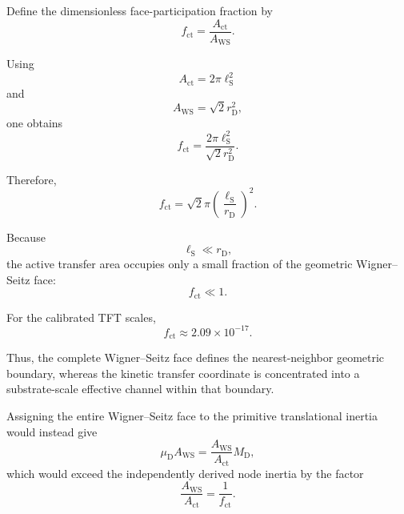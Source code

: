 Define the dimensionless face-participation fraction by
\begin{equation}
    f_{\mathrm{ct}} = \frac{A_{\mathrm{ct}}}{A_{\mathrm{WS}}}.
\end{equation}

Using
\begin{equation}
    A_{\mathrm{ct}} = 2\pi\ell_{\mathrm{S}}^2
\end{equation}
and
\begin{equation}
    A_{\mathrm{WS}} = \sqrt{2}r_{\mathrm{D}}^2,
\end{equation}
one obtains
\begin{equation}
    f_{\mathrm{ct}} = \frac{ 2\pi\ell_{\mathrm{S}}^2 }{ \sqrt{2}r_{\mathrm{D}}^2 }.
\end{equation}

Therefore,
\begin{equation}
    \boxed{ f_{\mathrm{ct}} = \sqrt{2}\pi \left( \frac{\ell_{\mathrm{S}}}{r_{\mathrm{D}}} \right)^2 }.
\end{equation}

Because
\begin{equation}
    \ell_{\mathrm{S}} \ll r_{\mathrm{D}},
\end{equation}
the active transfer area occupies only a small fraction of the geometric Wigner--Seitz face:
\begin{equation}
    \boxed{ f_{\mathrm{ct}} \ll 1 }.
\end{equation}

For the calibrated TFT scales,
\begin{equation}
    f_{\mathrm{ct}} \approx 2.09\times 10^{-17}.
\end{equation}

Thus, the complete Wigner--Seitz face defines the nearest-neighbor geometric boundary, whereas the kinetic transfer coordinate is concentrated into a substrate-scale effective channel within that boundary.

Assigning the entire Wigner--Seitz face to the primitive translational inertia would instead give
\begin{equation}
    \mu_{\mathrm{D}}A_{\mathrm{WS}} = \frac{A_{\mathrm{WS}}}{A_{\mathrm{ct}}} M_{\mathrm{D}},
\end{equation}
which would exceed the independently derived node inertia by the factor
\begin{equation}
    \frac{A_{\mathrm{WS}}}{A_{\mathrm{ct}}} = \frac{1}{f_{\mathrm{ct}}}.
\end{equation}

